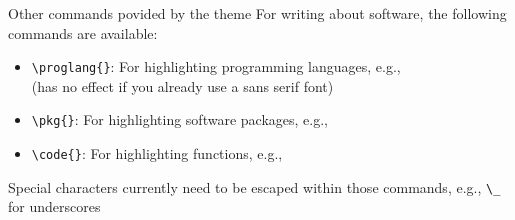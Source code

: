 \documentclass[pdfpagelabels=false, usepdftitle=false]{beamer}
\begin{document}
\begin{frame}[fragile]{Other commands povided by the theme}
For writing about software, the following commands are available:

\bigskip
\begin{itemize}
  \item \verb+\proglang{}+: For highlighting programming languages, e.g.,
   \\
  \smallskip
  {\small (has no effect if you already use a sans serif font)}
  \medskip
  \item \verb+\pkg{}+: For highlighting software packages, e.g., 
  \medskip
  \item \verb+\code{}+: For highlighting functions, e.g.,
\end{itemize}

\vfill

\begin{itemize}
  \arrowitem Special characters currently need to be escaped within those
  commands, e.g., \verb+\_+ for underscores
\end{itemize}
\end{frame}
\end{document}
